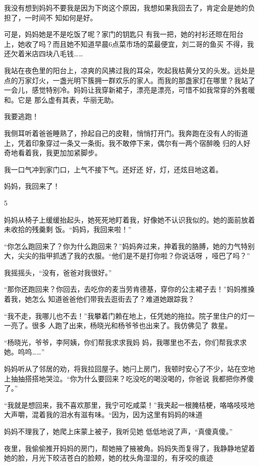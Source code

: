 \documentclass{article}
\begin{document}
我没有想到妈妈不要我是因为下岗这个原因，我想如果我回去了，肯定会是她的负担了，一时间不
知如何是好。 

可是，妈妈她是不是吃饭了呢？家门的钥匙只
\newpage
有我一把，她的衬衫还晾在阳台上，她收了吗？而且她不知道早晨6点菜市场的菜最便宜，刘二哥的鱼买
不得，我还欠着米店四块八毛钱…… 

我站在夜色里的阳台上，凉爽的风拂过我的耳朵，吹起我枯黄分叉的头发。远处是点的万家灯火，一盏光明下簇拥一群欢乐的家人。而我的那盏家灯在哪里？我站了一会儿，感觉特别冷。妈妈让我穿新裙子，漂亮是漂亮，可惜不如我常穿的外套暖和。它是
那么虚有其表，华丽无助。 


我要逃跑！ 

我侧耳听着爸爸睡熟了，拎起自己的皮鞋，悄悄打开门。我奔跑在没有人的街道上，凭着印象穿过一条又一条街。我不敢停下来，偶尔有一两个宿醉晚
归的人好奇地看着我，我更加加紧脚步。 

我一口气冲到家门口，上气不接下气。还好还
好，灯，还炫目地这着。 

\newpage


妈妈，我回来了！ 


5 

妈妈从椅子上缓缓抬起头，她死死地盯着我，好像她不认识我似的。她的面前放着未收拾的残羹剩
饭。“妈妈，我回来啦！” 

“你怎么跑回来了？你为什么跑回来？”妈妈奔过来，抻着我的胳膊，她的力气特别大，尖尖的指甲抓透了我的衣服。“他们是不是打你啦？你说话呀
，哑巴了吗？” 


我摇摇头，“没有，爸爸对我很好。” 

“那你还跑回来？你回去，去吃你的麦当劳肯德基，穿你的公主裙子去！”妈妈推搡着我，她怎么
知道爸爸他们带我去逛街去了？难道她跟踪我？ 

“我不走，我哪儿也不去！”我攀着门赖在地上，任凭她的拖拉。院子里住户的灯一一亮了。很多
\newpage
人跑了出来，杨晓光和杨爷爷也出来了。我仿佛见了
救星。 

“杨晓光，爷爷，李阿姨，你们帮我求求我妈
妈，我哪里也不去，你们帮我求求她。呜呜……” 

妈妈听从了邻居的劝，将我拉回屋子。她闩上房门，我顿时安心了不少，站在空地上抽抽搭搭地哭泣。“你为什么要回来？吃没吃的喝没喝的，你爸说
我都把你养傻了。” 

“我就是想回来，我不喜欢那里，我宁可吃咸菜！”我夹起一根腌桔梗，咯咯吱吱地大声嚼，混着我的泪水有滋有味。“因为，因为这里有妈妈的味道

妈妈不理我了，她爬上床蒙上被子，我听见她
低低地说了声，“真傻真傻。” 

夜里，我偷偷推开妈妈的房门，帮她掖了掖被角。妈妈失而复得了，我静静地望着她的脸，月光下皎洁苍白的脸颊，她的枕头角湿湿的，有牙咬的痕迹
\newpage
\end{document}
